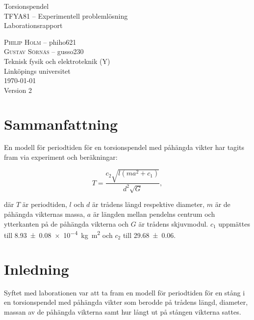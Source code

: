 \documentclass[a4paper,12pt]{article}
\begin{document}
\begin{titlepage}
  \centering
  \vspace{10cm}
  {\Huge Torsionspendel \\}
  \vspace{2cm}
  {\Large TFYA81 -- Experimentell problemlösning \\}
  \vspace{0.8em}
  {\Large Laborationsrapport}
  \vfill

  {
    \textsc{Philip Holm} -- phiho621 \\
    \textsc{Gustav Sörnäs} -- gusso230 \\
    \vspace{2cm}
    Teknisk fysik och elektroteknik (Y) \\
    Linköpings universitet\\\today{}\\Version 2
  }

\end{titlepage}

\section*{Sammanfattning}

En modell för periodtiden för en torsionspendel med påhängda vikter har tagits
fram via experiment och beräkningar:

\begin{equation*}
  T = \frac{c_2 \sqrt{l(ma^2 + c_1)}}{d^2 \sqrt{G}},
\end{equation*}

där $T$ är periodtiden, $l$ och $d$ är trådens längd respektive diameter, $m$ är
de påhängda vikternas massa, $a$ är längden mellan pendelns centrum och
ytterkanten på de påhängda vikterna och $G$ är trådens skjuvmodul. $c_1$
uppmättes till \SI{8.93(8)e-4}{\kilogram \meter \squared} och $c_2$ till
\num{29.68(6)}.

\clearpage

\tableofcontents
\listoffigures
\listoftables
\clearpage


\section{Inledning}

Syftet med laborationen var att ta fram en modell för periodtiden för en stång i
en torsionspendel med påhängda vikter som berodde på trådens längd, diameter,
massan av de påhängda vikterna samt hur långt ut på stången vikterna sattes.
\end{document}
